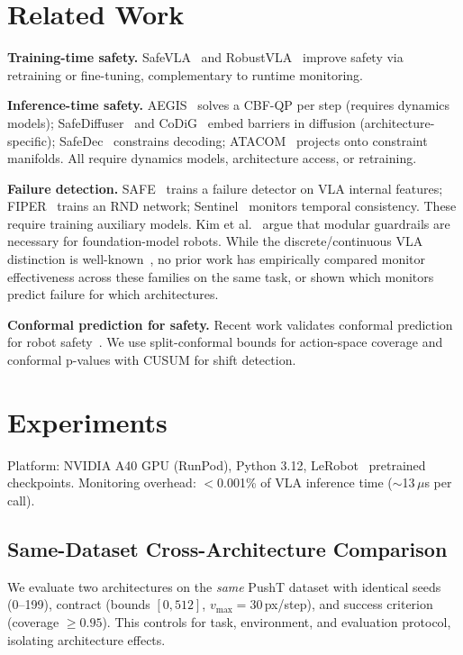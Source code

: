 \documentclass[conference]{IEEEtran}
\begin{document}
\section{Related Work}

\textbf{Training-time safety.}
SafeVLA~\cite{safevla} and RobustVLA~\cite{robustvla} improve safety via retraining or fine-tuning, complementary to runtime monitoring.

\textbf{Inference-time safety.}
AEGIS~\cite{aegis} solves a CBF-QP per step (requires dynamics models); SafeDiffuser~\cite{safediffuser} and CoDiG~\cite{codig} embed barriers in diffusion (architecture-specific); SafeDec~\cite{safedec} constrains decoding; ATACOM~\cite{atacom} projects onto constraint manifolds.
All require dynamics models, architecture access, or retraining.

\textbf{Failure detection.}
SAFE~\cite{safe2025} trains a failure detector on VLA internal features; FIPER~\cite{fiper2025} trains an RND network; Sentinel~\cite{sentinel} monitors temporal consistency.
These require training auxiliary models.
Kim et al.~\cite{kim2026guardrails} argue that modular guardrails are necessary for foundation-model robots.
While the discrete/continuous VLA distinction is well-known~\cite{rt2,diffusionpolicy}, no prior work has empirically compared monitor effectiveness across these families on the same task, or shown which monitors predict failure for which architectures.

\textbf{Conformal prediction for safety.}
Recent work validates conformal prediction for robot safety~\cite{safe2025,feldman2025}.
We use split-conformal bounds for action-space coverage and conformal p-values with CUSUM for shift detection.

\section{Experiments}

Platform: NVIDIA A40 GPU (RunPod), Python 3.12, LeRobot~\cite{lerobot} pretrained checkpoints.
Monitoring overhead: $<$0.001\% of VLA inference time (${\sim}$13\,$\mu$s per call).

\subsection{Same-Dataset Cross-Architecture Comparison}
\label{sec:crossarch}

We evaluate two architectures on the \emph{same} PushT dataset with identical seeds (0--199), contract (bounds $[0, 512]$, $v_{\max}{=}30$\,px/step), and success criterion (coverage ${\ge}0.95$).
This controls for task, environment, and evaluation protocol, isolating architecture effects.
\end{document}
